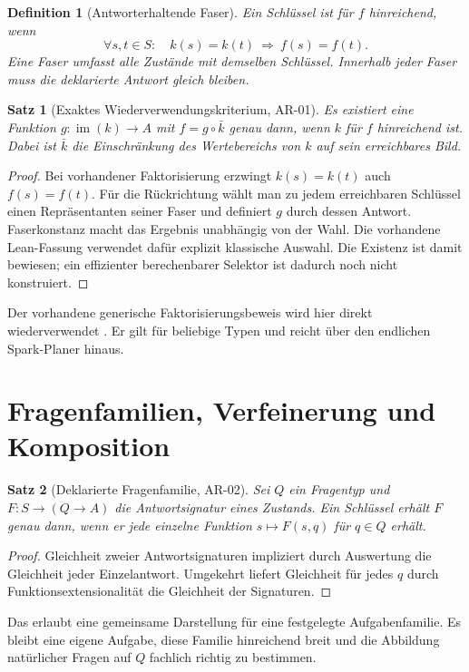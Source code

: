 \documentclass[11pt,a4paper]{article}
\newtheorem{satz}{Satz}
\newtheorem{definition}{Definition}
\newcommand{\AR}[1]{\textsf{AR-#1}}
\newcommand{\im}{\operatorname{im}}
\begin{document}
\begin{definition}[Antworterhaltende Faser]
Ein Schlüssel ist für $f$ hinreichend, wenn
\[
 \forall s,t\in S:\quad k(s)=k(t)\ \Longrightarrow\ f(s)=f(t).
\]
Eine Faser umfasst alle Zustände mit demselben Schlüssel. Innerhalb jeder Faser
muss die deklarierte Antwort gleich bleiben.
\end{definition}

\begin{satz}[Exaktes Wiederverwendungskriterium, \AR{01}]
Es existiert eine Funktion $g:\im(k)\to A$ mit $f=g\circ\bar k$ genau dann,
wenn $k$ für $f$ hinreichend ist. Dabei ist $\bar k$ die Einschränkung des
Wertebereichs von $k$ auf sein erreichbares Bild.
\end{satz}
\begin{proof}
Bei vorhandener Faktorisierung erzwingt $k(s)=k(t)$ auch $f(s)=f(t)$.
Für die Rückrichtung wählt man zu jedem erreichbaren Schlüssel einen Repräsentanten
seiner Faser und definiert $g$ durch dessen Antwort. Faserkonstanz macht das
Ergebnis unabhängig von der Wahl. Die vorhandene Lean-Fassung verwendet dafür
explizit klassische Auswahl. Die Existenz ist damit bewiesen; ein effizienter
berechenbarer Selektor ist dadurch noch nicht konstruiert.
\end{proof}

Der vorhandene generische Faktorisierungsbeweis wird hier direkt wiederverwendet
\cite{qikfactor}. Er gilt für beliebige Typen und reicht über den endlichen
Spark-Planer hinaus.

\section{Fragenfamilien, Verfeinerung und Komposition}
\begin{satz}[Deklarierte Fragenfamilie, \AR{02}]
Sei $Q$ ein Fragentyp und $F:S\to(Q\to A)$ die Antwortsignatur eines Zustands.
Ein Schlüssel erhält $F$ genau dann, wenn er jede einzelne Funktion
$s\mapsto F(s,q)$ für $q\in Q$ erhält.
\end{satz}
\begin{proof}
Gleichheit zweier Antwortsignaturen impliziert durch Auswertung die Gleichheit
jeder Einzelantwort. Umgekehrt liefert Gleichheit für jedes $q$ durch
Funktionsextensionalität die Gleichheit der Signaturen.
\end{proof}
Das erlaubt eine gemeinsame Darstellung für eine festgelegte Aufgabenfamilie.
Es bleibt eine eigene Aufgabe, diese Familie hinreichend breit und die Abbildung
natürlicher Fragen auf $Q$ fachlich richtig zu bestimmen.
\end{document}
